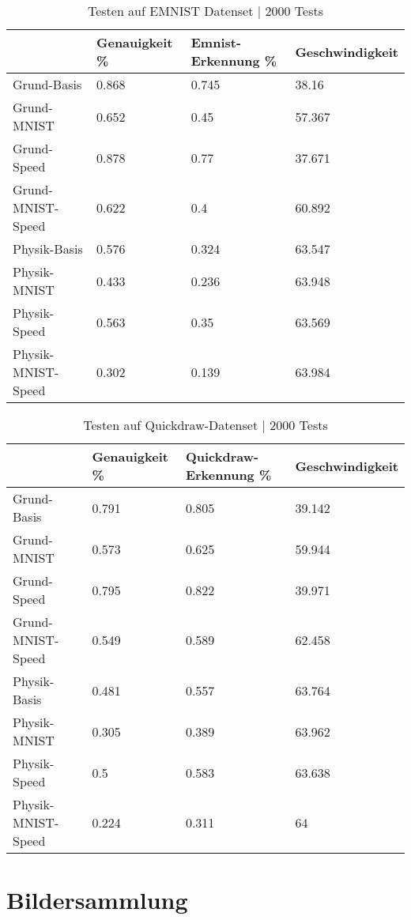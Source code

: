 \begin{table}[!ht]
    \centering
    \caption{Testen auf EMNIST Datenset | 2000 Tests}
    \begin{tabular}{|l|l|l|l|}
    \hline
        ~ & Genauigkeit \% & Emnist-Erkennung \% & Geschwindigkeit \\ \hline
        Grund-Basis & 0.868 & 0.745 & 38.16 \\ \hline
        Grund-MNIST & 0.652 & 0.45 & 57.367 \\ \hline
        Grund-Speed & 0.878 & 0.77 & 37.671 \\ \hline
        Grund-MNIST-Speed & 0.622 & 0.4 & 60.892 \\ \hline
        Physik-Basis & 0.576 & 0.324 & 63.547 \\ \hline
        Physik-MNIST & 0.433 & 0.236 & 63.948 \\ \hline
        Physik-Speed & 0.563 & 0.35 & 63.569 \\ \hline
        Physik-MNIST-Speed & 0.302 & 0.139 & 63.984 \\ \hline
    \end{tabular}
    \label{tab:EMNIST}
\end{table}

\begin{table}[!ht]
    \centering
    \caption{Testen auf Quickdraw-Datenset | 2000 Tests}
    \begin{tabular}{|l|l|l|l|}
    \hline
        ~ & Genauigkeit \% & Quickdraw-Erkennung \% & Geschwindigkeit \\ \hline
        Grund-Basis & 0.791 & 0.805 & 39.142 \\ \hline
        Grund-MNIST & 0.573 & 0.625 & 59.944 \\ \hline
        Grund-Speed & 0.795 & 0.822 & 39.971 \\ \hline
        Grund-MNIST-Speed & 0.549 & 0.589 & 62.458 \\ \hline
        Physik-Basis & 0.481 & 0.557 & 63.764 \\ \hline
        Physik-MNIST & 0.305 & 0.389 & 63.962 \\ \hline
        Physik-Speed & 0.5 & 0.583 & 63.638 \\ \hline
        Physik-MNIST-Speed & 0.224 & 0.311 & 64 \\ \hline
    \end{tabular}
    \label{tab:Quickdraw}
\end{table}

\section{Bildersammlung}

